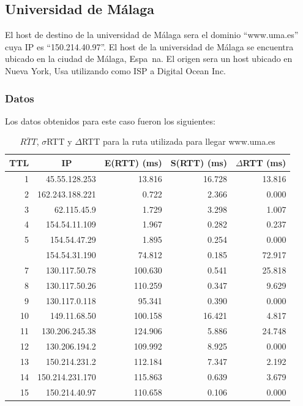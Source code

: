 \subsection{Universidad de M\'alaga}
El host de destino de la universidad de M\'alaga sera el dominio ``www.uma.es'' cuya IP es ``150.214.40.97''. El host de la universidad de M\'alaga se encuentra ubicado en la ciudad de M\'alaga, Espa~{n}a. El origen sera un host ubicado en Nueva York, Usa utilizando como ISP a Digital Ocean Inc.


\subsubsection{Datos}

Los datos obtenidos para este caso fueron los siguientes:

\begin{table}[H]
    \begin{center}
        \begin{tabular}{| r | r | r | r | r |}
  \hline
  {\bf TTL} & \multicolumn{1}{|c|}{\bf IP} & {\bf E(RTT) (ms)} & {\bf S(RTT) (ms)} & {\bf $\Delta$RTT (ms)}\\
  \hline
\hline 1 & 45.55.128.253 & 13.816 & 16.728 & 13.816\\
\hline 2 & 162.243.188.221 & 0.722 & 2.366 & 0.000\\
\hline 3 & 62.115.45.9 & 1.729 & 3.298 & 1.007\\
\hline 4 & 154.54.11.109 & 1.967 & 0.282 & 0.237\\
\hline 5 & 154.54.47.29 & 1.895 & 0.254 & 0.000\\
\rowcolor{blue!25}\hline 6 & 154.54.31.190 & 74.812 & 0.185 & 72.917\\
\hline 7 & 130.117.50.78 & 100.630 & 0.541 & 25.818\\
\hline 8 & 130.117.50.26 & 110.259 & 0.347 & 9.629\\
\hline 9 & 130.117.0.118 & 95.341 & 0.390 & 0.000\\
\hline 10 & 149.11.68.50 & 100.158 & 16.421 & 4.817\\
\hline 11 & 130.206.245.38 & 124.906 & 5.886 & 24.748\\
\hline 12 & 130.206.194.2 & 109.992 & 8.925 & 0.000\\
\hline 13 & 150.214.231.2 & 112.184 & 7.347 & 2.192\\
\hline 14 & 150.214.231.170 & 115.863 & 0.639 & 3.679\\
\hline 15 & 150.214.40.97 & 110.658 & 0.106 & 0.000\\
\hline
        \end{tabular}
        \caption{$\overline{RTT}$, $\sigma$RTT y $\Delta$RTT para la ruta utilizada para llegar www.uma.es}
        \label{table:malaga} 
    \end{center}
\end{table}

